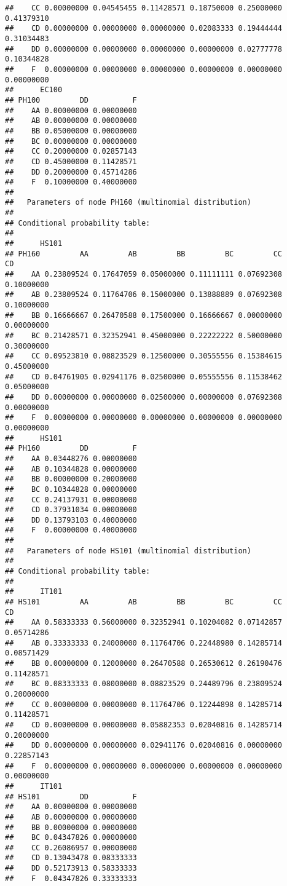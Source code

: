 \documentclass[
]{article}
\begin{document}
\begin{verbatim}
##    CC 0.00000000 0.04545455 0.11428571 0.18750000 0.25000000 0.41379310
##    CD 0.00000000 0.00000000 0.00000000 0.02083333 0.19444444 0.31034483
##    DD 0.00000000 0.00000000 0.00000000 0.00000000 0.02777778 0.10344828
##    F  0.00000000 0.00000000 0.00000000 0.00000000 0.00000000 0.00000000
##      EC100
## PH100         DD          F
##    AA 0.00000000 0.00000000
##    AB 0.00000000 0.00000000
##    BB 0.05000000 0.00000000
##    BC 0.00000000 0.00000000
##    CC 0.20000000 0.02857143
##    CD 0.45000000 0.11428571
##    DD 0.20000000 0.45714286
##    F  0.10000000 0.40000000
## 
##   Parameters of node PH160 (multinomial distribution)
## 
## Conditional probability table:
##  
##      HS101
## PH160         AA         AB         BB         BC         CC         CD
##    AA 0.23809524 0.17647059 0.05000000 0.11111111 0.07692308 0.10000000
##    AB 0.23809524 0.11764706 0.15000000 0.13888889 0.07692308 0.10000000
##    BB 0.16666667 0.26470588 0.17500000 0.16666667 0.00000000 0.00000000
##    BC 0.21428571 0.32352941 0.45000000 0.22222222 0.50000000 0.30000000
##    CC 0.09523810 0.08823529 0.12500000 0.30555556 0.15384615 0.45000000
##    CD 0.04761905 0.02941176 0.02500000 0.05555556 0.11538462 0.05000000
##    DD 0.00000000 0.00000000 0.02500000 0.00000000 0.07692308 0.00000000
##    F  0.00000000 0.00000000 0.00000000 0.00000000 0.00000000 0.00000000
##      HS101
## PH160         DD          F
##    AA 0.03448276 0.00000000
##    AB 0.10344828 0.00000000
##    BB 0.00000000 0.20000000
##    BC 0.10344828 0.00000000
##    CC 0.24137931 0.00000000
##    CD 0.37931034 0.00000000
##    DD 0.13793103 0.40000000
##    F  0.00000000 0.40000000
## 
##   Parameters of node HS101 (multinomial distribution)
## 
## Conditional probability table:
##  
##      IT101
## HS101         AA         AB         BB         BC         CC         CD
##    AA 0.58333333 0.56000000 0.32352941 0.10204082 0.07142857 0.05714286
##    AB 0.33333333 0.24000000 0.11764706 0.22448980 0.14285714 0.08571429
##    BB 0.00000000 0.12000000 0.26470588 0.26530612 0.26190476 0.11428571
##    BC 0.08333333 0.08000000 0.08823529 0.24489796 0.23809524 0.20000000
##    CC 0.00000000 0.00000000 0.11764706 0.12244898 0.14285714 0.11428571
##    CD 0.00000000 0.00000000 0.05882353 0.02040816 0.14285714 0.20000000
##    DD 0.00000000 0.00000000 0.02941176 0.02040816 0.00000000 0.22857143
##    F  0.00000000 0.00000000 0.00000000 0.00000000 0.00000000 0.00000000
##      IT101
## HS101         DD          F
##    AA 0.00000000 0.00000000
##    AB 0.00000000 0.00000000
##    BB 0.00000000 0.00000000
##    BC 0.04347826 0.00000000
##    CC 0.26086957 0.00000000
##    CD 0.13043478 0.08333333
##    DD 0.52173913 0.58333333
##    F  0.04347826 0.33333333
\end{verbatim}
\end{document}
